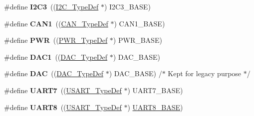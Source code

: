 \begin{DoxyCompactItemize}
\item 
\mbox{\label{group___peripheral__declaration_ga1489b37ed2bca9d9c659119590583bda}} 
\#define {\bfseries I2\+C3}~((\mbox{\hyperlink{struct_i2_c___type_def}{I2\+C\+\_\+\+Type\+Def}} $\ast$) I2\+C3\+\_\+\+B\+A\+SE)
\item 
\mbox{\label{group___peripheral__declaration_ga4964ecb6a5c689aaf8ee2832b8093aac}} 
\#define {\bfseries C\+A\+N1}~((\mbox{\hyperlink{struct_c_a_n___type_def}{C\+A\+N\+\_\+\+Type\+Def}} $\ast$) C\+A\+N1\+\_\+\+B\+A\+SE)
\item 
\mbox{\label{group___peripheral__declaration_ga04651c526497822a859942b928e57f8e}} 
\#define {\bfseries P\+WR}~((\mbox{\hyperlink{struct_p_w_r___type_def}{P\+W\+R\+\_\+\+Type\+Def}} $\ast$) P\+W\+R\+\_\+\+B\+A\+SE)
\item 
\mbox{\label{group___peripheral__declaration_gaffb5ff8779fa698f3c7165a617d56e4f}} 
\#define {\bfseries D\+A\+C1}~((\mbox{\hyperlink{struct_d_a_c___type_def}{D\+A\+C\+\_\+\+Type\+Def}} $\ast$) D\+A\+C\+\_\+\+B\+A\+SE)
\item 
\mbox{\label{group___peripheral__declaration_ga4aa2a4ab86ce00c23035e5cee2e7fc7e}} 
\#define {\bfseries D\+AC}~((\mbox{\hyperlink{struct_d_a_c___type_def}{D\+A\+C\+\_\+\+Type\+Def}} $\ast$) D\+A\+C\+\_\+\+B\+A\+SE) /$\ast$ Kept for legacy purpose $\ast$/
\item 
\mbox{\label{group___peripheral__declaration_ga20bc10f5b73e8b51724b2f23c5b2e785}} 
\#define {\bfseries U\+A\+R\+T7}~((\mbox{\hyperlink{struct_u_s_a_r_t___type_def}{U\+S\+A\+R\+T\+\_\+\+Type\+Def}} $\ast$) U\+A\+R\+T7\+\_\+\+B\+A\+SE)
\item 
\mbox{\label{group___peripheral__declaration_ga2fe70804956e53dcbdc82dbacbbbfabc}} 
\#define {\bfseries U\+A\+R\+T8}~((\mbox{\hyperlink{struct_u_s_a_r_t___type_def}{U\+S\+A\+R\+T\+\_\+\+Type\+Def}} $\ast$) \mbox{\hyperlink{group___peripheral__memory__map_gac9c6cd59a248941d9d2462ab21a2346e}{U\+A\+R\+T8\+\_\+\+B\+A\+SE}})
\item 

\end{DoxyCompactItemize}

